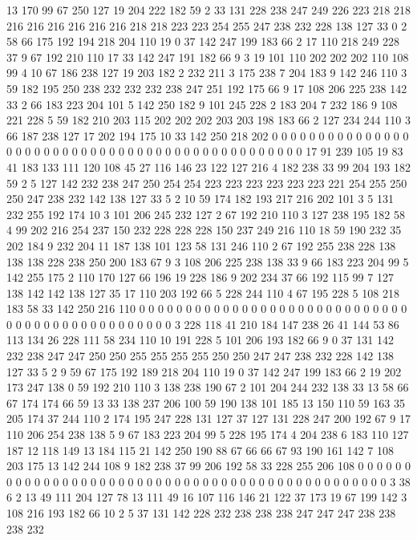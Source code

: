 13 170 99 67 250 127 19 204 222 182 59 2 33 131 228 238 247 249 226 223
218 218 216 216 216 216 216 216 218 218 223 223 254 255 247 238 232 228 138 127
33 0 2 58 66 175 192 194 218 204 110 19 0 37 142 247 199 183 66 2
17 110 218 249 228 37 9 67 192 210 110 17 33 142 247 191 182 66 9 3
19 101 110 202 202 202 110 108 99 4 10 67 186 238 127 19 203 182 2 232
211 3 175 238 7 204 183 9 142 246 110 3 59 182 195 250 238 232 232 232
238 247 251 192 175 66 9 17 108 206 225 238 142 33 2 66 183 223 204 101
5 142 250 182 9 101 245 228 2 183 204 7 232 186 9 108 221 228 5 59
182 210 203 115 202 202 202 203 203 198 183 66 2 127 234 244 110 3 66 187
238 127 17 202 194 175 10 33 142 250 218 202 0 0 0 0 0 0 0 0
0 0 0 0 0 0 0 0 0 0 0 0 0 0 0 0 0 0 0 0
0 0 0 0 0 0 0 0 0 0 0 0 0 0 0 0 0 0 0 17
91 239 105 19 83 41 183 133 111 120 108 45 27 116 146 23 122 127 216 4
182 238 33 99 204 193 182 59 2 5 127 142 232 238 247 250 254 254 223 223
223 223 223 223 221 254 255 250 250 247 238 232 142 138 127 33 5 2 10 59
174 182 193 217 216 202 101 3 5 131 232 255 192 174 10 3 101 206 245 232
127 2 67 192 210 110 3 127 238 195 182 58 4 99 202 216 254 237 150 232
228 228 228 150 237 249 216 110 18 59 190 232 35 202 184 9 232 204 11 187
138 101 123 58 131 246 110 2 67 192 255 238 228 138 138 138 228 238 250 200
183 67 9 3 108 206 225 238 138 33 9 66 183 223 204 99 5 142 255 175
2 110 170 127 66 196 19 228 186 9 202 234 37 66 192 115 99 7 127 138
142 142 138 127 35 17 110 203 192 66 5 228 244 110 4 67 195 228 5 108
218 183 58 33 142 250 216 110 0 0 0 0 0 0 0 0 0 0 0 0
0 0 0 0 0 0 0 0 0 0 0 0 0 0 0 0 0 0 0 0
0 0 0 0 0 0 0 0 0 0 0 0 0 0 0 3 228 118 41 210
184 147 238 26 41 144 53 86 113 134 26 228 111 58 234 110 10 191 228 5
101 206 193 182 66 9 0 37 131 142 232 238 247 247 250 250 255 255 255 255
250 250 247 247 238 232 228 142 138 127 33 5 2 9 59 67 175 192 189 218
204 110 19 0 37 142 247 199 183 66 2 19 202 173 247 138 0 59 192 210
110 3 138 238 190 67 2 101 204 244 232 138 33 13 58 66 67 174 174 66
59 13 33 138 237 206 100 59 190 138 101 185 13 150 110 59 163 35 205 174
37 244 110 2 174 195 247 228 131 127 37 127 131 228 247 200 192 67 9 17
110 206 254 238 138 5 9 67 183 223 204 99 5 228 195 174 4 204 238 6
183 110 127 187 12 118 149 13 184 115 21 142 250 190 88 67 66 66 67 93
190 161 142 7 108 203 175 13 142 244 108 9 182 238 37 99 206 192 58 33
228 255 206 108 0 0 0 0 0 0 0 0 0 0 0 0 0 0 0 0
0 0 0 0 0 0 0 0 0 0 0 0 0 0 0 0 0 0 0 0
0 0 0 0 0 0 0 0 0 0 0 3 38 6 2 13 49 111 204 127
78 13 111 49 16 107 116 146 21 122 37 173 19 67 199 142 3 108 216 193
182 66 10 2 5 37 131 142 228 232 238 238 238 247 247 247 238 238 238 232
